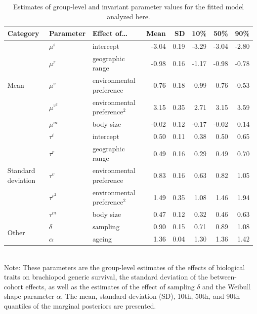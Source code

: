 \documentclass[11pt]{article}
\begin{document}
\begin{table}[ht!]
  \caption{Estimates of group-level and invariant parameter values for the fitted model analyzed here. }
  \label{tab:param}
  \begin{centering}
      \begin{tabular}{ l | l p{2.5cm} r r r r r }
        Category & Parameter & Effect of\dots & Mean & SD & 10\% & 50\% & 90\% \\ 
        \hline
        \multirow{5}{*}{Mean} & \(\mu^{i}\) & intercept & -3.04 & 0.19 & -3.29 & -3.04 & -2.80 \\ 
        & \(\mu^{r}\) & geographic range & -0.98 & 0.16 & -1.17 & -0.98 & -0.78 \\ 
        & \(\mu^{v}\) & environmental preference & -0.76 & 0.18 & -0.99 & -0.76 & -0.53 \\ 
        & \(\mu^{v^{2}}\) & environmental preference\(^{2}\) & 3.15 & 0.35 & 2.71 & 3.15 & 3.59 \\ 
        & \(\mu^{m}\) & body size & -0.02 & 0.12 & -0.17 & -0.02 & 0.14 \\ 
        \hline
        \multirow{5}{*}{Standard deviation} & \(\tau^{i}\) & intercept & 0.50 & 0.11 & 0.38 & 0.50 & 0.65 \\ 
        & \(\tau^{r}\) & geographic range & 0.49 & 0.16 & 0.29 & 0.49 & 0.70 \\ 
        & \(\tau^{v}\) & environmental preference & 0.83 & 0.16 & 0.63 & 0.82 & 1.05 \\ 
        & \(\tau^{v^{2}}\) & environmental preference\(^{2}\) & 1.49 & 0.35 & 1.08 & 1.46 & 1.94 \\ 
        & \(\tau^{m}\) & body size & 0.47 & 0.12 & 0.32 & 0.46 & 0.63 \\ 
        \hline
        \multirow{2}{*}{Other} & \(\delta\) & sampling & 0.90 & 0.15 & 0.71 & 0.89 & 1.08 \\ 
        & \(\alpha\) & ageing & 1.36 & 0.04 & 1.30 & 1.36 & 1.42 \\ 
        \hline
      \end{tabular}
  \end{centering}
  \bigskip{}
  \\
  {\footnotesize{Note: These parameters are the group-level estimates of the effects of biological traits on brachiopod generic survival, the standard deviation of the between-cohort effects, as well as the estimates of the effect of sampling \(\delta\) and the Weibull shape parameter \(\alpha\). The mean, standard deviation (SD), 10th, 50th, and 90th quantiles of the marginal posteriors are presented.}}
\end{table}
\end{document}
